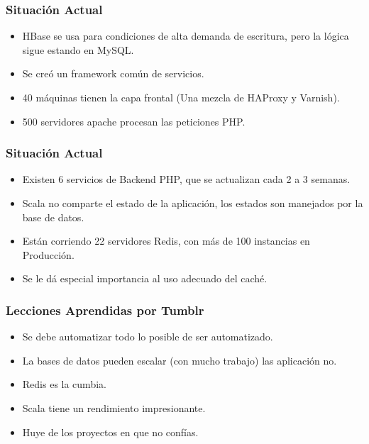 \documentclass[12pt]{beamer}
\begin{document}
\begin{frame}
 \frametitle{Situación Actual}
 \begin{itemize}
  \item<2-> HBase se usa para condiciones de alta demanda de escritura, pero la lógica sigue estando en MySQL.
  \item<3-> Se creó un framework común de servicios.
  \item<4-> 40 máquinas tienen la capa frontal (Una mezcla de HAProxy y Varnish).
  \item<5-> 500 servidores apache procesan las peticiones PHP.
 \end{itemize}
\end{frame}


\begin{frame}
 \frametitle{Situación Actual}
 \begin{itemize}
  \item<2-> Existen 6 servicios de Backend PHP, que se actualizan cada 2 a 3 semanas.
  \item<3-> Scala no comparte el estado de la aplicación, los estados son manejados por la base de datos.
  \item<4-> Están corriendo 22 servidores Redis, con más de 100 instancias en Producción.
  \item<5-> Se le dá especial importancia al uso adecuado del caché.
 \end{itemize}
\end{frame}

\begin{frame}
 \frametitle{Lecciones Aprendidas por Tumblr}
  \begin{itemize}
   \item<2-> Se debe automatizar todo lo posible de ser automatizado.
   \item<3-> La bases de datos pueden escalar (con mucho trabajo) las aplicación no.
   \item<4-> Redis es la cumbia.
   \item<5-> Scala tiene un rendimiento impresionante.
   \item<6-> Huye de los proyectos en que no confías.
  \end{itemize}
\end{frame}
\end{document}
